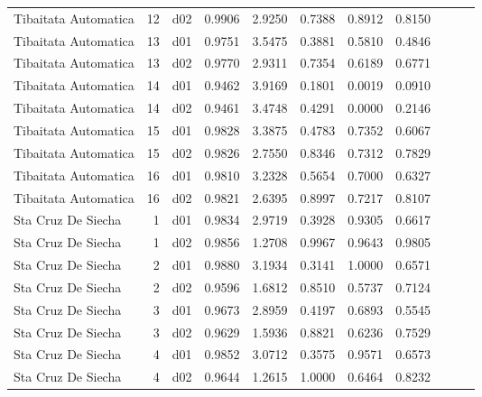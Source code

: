 \begin{landscape}
\begin{longtable}{p{2cm}rrrrrrrrrr}
 Tibaitata Automatica  &         12 &     d02 &   0.9906 &  2.9250 &        0.7388 &           0.8912 &  0.8150 \\
 Tibaitata Automatica  &         13 &     d01 &   0.9751 &  3.5475 &        0.3881 &           0.5810 &  0.4846 \\
 Tibaitata Automatica  &         13 &     d02 &   0.9770 &  2.9311 &        0.7354 &           0.6189 &  0.6771 \\
 Tibaitata Automatica  &         14 &     d01 &   0.9462 &  3.9169 &        0.1801 &           0.0019 &  0.0910 \\
 Tibaitata Automatica  &         14 &     d02 &   0.9461 &  3.4748 &        0.4291 &           0.0000 &  0.2146 \\
 Tibaitata Automatica  &         15 &     d01 &   0.9828 &  3.3875 &        0.4783 &           0.7352 &  0.6067 \\
 Tibaitata Automatica  &         15 &     d02 &   0.9826 &  2.7550 &        0.8346 &           0.7312 &  0.7829 \\
 Tibaitata Automatica  &         16 &     d01 &   0.9810 &  3.2328 &        0.5654 &           0.7000 &  0.6327 \\
 Tibaitata Automatica  &         16 &     d02 &   0.9821 &  2.6395 &        0.8997 &           0.7217 &  0.8107 \\
   Sta Cruz De Siecha  &          1 &     d01 &   0.9834 &  2.9719 &        0.3928 &           0.9305 &  0.6617 \\
   Sta Cruz De Siecha  &          1 &     d02 &   0.9856 &  1.2708 &        0.9967 &           0.9643 &  0.9805 \\
   Sta Cruz De Siecha  &          2 &     d01 &   0.9880 &  3.1934 &        0.3141 &           1.0000 &  0.6571 \\
   Sta Cruz De Siecha  &          2 &     d02 &   0.9596 &  1.6812 &        0.8510 &           0.5737 &  0.7124 \\
   Sta Cruz De Siecha  &          3 &     d01 &   0.9673 &  2.8959 &        0.4197 &           0.6893 &  0.5545 \\
   Sta Cruz De Siecha  &          3 &     d02 &   0.9629 &  1.5936 &        0.8821 &           0.6236 &  0.7529 \\
   Sta Cruz De Siecha  &          4 &     d01 &   0.9852 &  3.0712 &        0.3575 &           0.9571 &  0.6573 \\
   Sta Cruz De Siecha  &          4 &     d02 &   0.9644 &  1.2615 &        1.0000 &           0.6464 &  0.8232 \\

\end{longtable}
\end{landscape}

